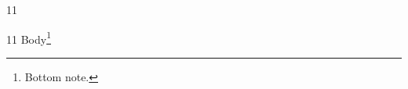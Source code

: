 \documentclass[paper=A4]{ropas-poster}
\begin{document}
\begin{postergrid}{1}{1}
\begin{posterblock}{1}{1}
Body\footnote{Bottom note.}
\end{posterblock}
\end{postergrid}
\end{document}

